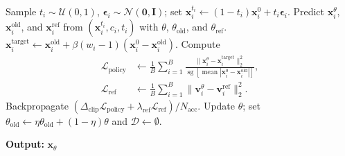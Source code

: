 \begin{algorithm}[H]
\begin{algorithmic}[1]
                \State Sample $t_i\sim\mathcal{U}(0,1)$,
                $\boldsymbol{\epsilon}_i\sim\mathcal{N}(\mathbf{0},\mathbf{I})$;
                set $\mathbf{x}_i^{t_i}\leftarrow
                (1-t_i)\mathbf{x}_i^0+t_i\boldsymbol{\epsilon}_i$.
                \State Predict $\mathbf{x}_i^\theta$,
                $\mathbf{x}_i^{\mathrm{old}}$, and $\mathbf{x}_i^{\mathrm{ref}}$
                from $(\mathbf{x}_i^{t_i},c_i,t_i)$ with
                $\theta$, $\theta_{\mathrm{old}}$, and $\theta_{\mathrm{ref}}$.
                \State $\mathbf{x}_i^{\mathrm{target}}\leftarrow
                \mathbf{x}_i^{\mathrm{old}}+
                \beta(w_i-1)(\mathbf{x}_i^0-\mathbf{x}_i^{\mathrm{old}})$.
                \State Compute
                \[
                    \begin{aligned}
                    \mathcal{L}_{\mathrm{policy}}
                    &\leftarrow\frac{1}{B}\sum_{i=1}^{B}
                    \frac{\|\mathbf{x}_i^\theta-\mathbf{x}_i^{\mathrm{target}}\|_2^2}
                    {\operatorname{sg}[\operatorname{mean}
                    |\mathbf{x}_i^0-\mathbf{x}_i^{\mathrm{old}}|]},\\
                    \mathcal{L}_{\mathrm{ref}}
                    &\leftarrow\frac{1}{B}\sum_{i=1}^{B}
                    \|\mathbf{v}_i^\theta-\mathbf{v}_i^{\mathrm{ref}}\|_2^2.
                    \end{aligned}
                \]
                \State Backpropagate
                $(\Delta_{\mathrm{clip}}\mathcal{L}_{\mathrm{policy}}+
                \lambda_{\mathrm{ref}}\mathcal{L}_{\mathrm{ref}})/N_{\mathrm{acc}}$.
            \EndFor
            \State Update $\theta$; set
            $\theta_{\mathrm{old}}\leftarrow
            \eta\theta_{\mathrm{old}}+(1-\eta)\theta$ and
            $\mathcal{D}\leftarrow\emptyset$.
        \EndFor
    \end{algorithmic}
    \textbf{Output:} $\mathbf{x}_\theta$
\end{algorithm}


